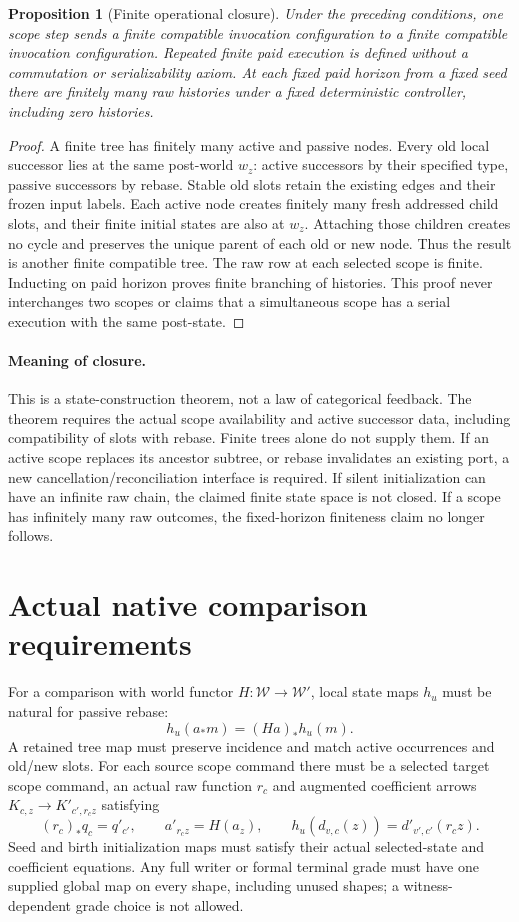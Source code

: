 \documentclass[11pt]{article}
\newtheorem{proposition}{Proposition}\newtheorem{definition}[proposition]{Definition}
\begin{document}
\begin{proposition}[Finite operational closure]
Under the preceding conditions, one scope step sends a finite compatible invocation configuration to a finite compatible invocation configuration. Repeated finite paid execution is defined without a commutation or serializability axiom. At each fixed paid horizon from a fixed seed there are finitely many raw histories under a fixed deterministic controller, including zero histories.
\end{proposition}
\begin{proof}
A finite tree has finitely many active and passive nodes. Every old local successor lies at the same post-world $w_z$: active successors by their specified type, passive successors by rebase. Stable old slots retain the existing edges and their frozen input labels. Each active node creates finitely many fresh addressed child slots, and their finite initial states are also at $w_z$. Attaching those children creates no cycle and preserves the unique parent of each old or new node. Thus the result is another finite compatible tree. The raw row at each selected scope is finite. Inducting on paid horizon proves finite branching of histories. This proof never interchanges two scopes or claims that a simultaneous scope has a serial execution with the same post-state.
\end{proof}

\paragraph{Meaning of closure.} This is a state-construction theorem, not a law of categorical feedback. The theorem requires the actual scope availability and active successor data, including compatibility of slots with rebase. Finite trees alone do not supply them. If an active scope replaces its ancestor subtree, or rebase invalidates an existing port, a new cancellation/reconciliation interface is required. If silent initialization can have an infinite raw chain, the claimed finite state space is not closed. If a scope has infinitely many raw outcomes, the fixed-horizon finiteness claim no longer follows.

\section{Actual native comparison requirements}
For a comparison with world functor $H:\mathcal W\to\mathcal W'$, local state maps $h_u$ must be natural for passive rebase:
\[
 h_u(a_*m)=(Ha)_*h_u(m).
\]
A retained tree map must preserve incidence and match active occurrences and old/new slots. For each source scope command there must be a selected target scope command, an actual raw function $r_c$ and augmented coefficient arrows $K_{c,z}\to K'_{c',r_cz}$ satisfying
\[
 (r_c)_*q_c=q'_{c'},\qquad a'_{r_cz}=H(a_z),\qquad
 h_u(d_{v,c}(z))=d'_{v',c'}(r_cz).
\]
Seed and birth initialization maps must satisfy their actual selected-state and coefficient equations. Any full writer or formal terminal grade must have one supplied global map on every shape, including unused shapes; a witness-dependent grade choice is not allowed.
\end{document}

